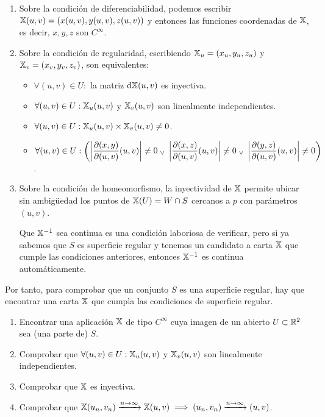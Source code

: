 
\begin{enumerate}
	\item Sobre la condición de diferenciabilidad, podemos escribir $\mathbb{X}(u, v) = (x(u, v), y(u, v), z(u, v))$ y entonces las funciones coordenadas de $\mathbb{X}$, es decir, $x, y, z$ son $C^\infty$.
	\item Sobre la condición de regularidad, escribiendo $\mathbb{X}_u = (x_u, y_u, z_u)$ y $\mathbb{X}_v = (x_v, y_v, z_v)$, son equivalentes:
	      \begin{itemize}
		      \item $\forall (u, v) \in U : $ la matriz $\odif{\X}(u, v)$ es inyectiva.
		      \item $\forall (u, v) \in U : \mathbb{X}_u(u, v)$ y $\mathbb{X}_v(u, v)$ son linealmente independientes.
		      \item $\forall (u, v) \in U : \mathbb{X}_u(u, v) \times \mathbb{X}_v(u, v) \neq 0$.
		      \item $\displaystyle \forall (u, v) \in U : \left( \left|\pdv{{(x, y)}}{{(u,v)}}(u,v)\right| \neq 0 \; _{\vee} \; \left|\pdv{{(x, z)}}{{(u,v)}}(u,v)\right| \neq 0 \; _{\vee} \; \left|\pdv{{(y, z)}}{{(u,v)}}(u,v)\right| \neq 0 \right)$.
	      \end{itemize}
	\item Sobre la condición de homeomorfismo, la inyectividad de $\mathbb{X}$ permite ubicar sin ambigüedad los puntos de $\mathbb{X}(U) = W\cap S$ cercanos a $p$ con parámetros $(u, v)$.

	      Que $\mathbb{X}^{-1}$ sea continua es una condición laboriosa de verificar, pero si ya sabemos que $S$ es superficie regular y tenemos un candidato a carta $\mathbb{X}$ que cumple las condiciones anteriores, entonces $\mathbb{X}^{-1}$ es continua automáticamente.
\end{enumerate}

Por tanto, para comprobar que un conjunto $S$ es una superficie regular, hay que encontrar una carta $\mathbb{X}$ que cumpla las condiciones de superficie regular.
\begin{enumerate}
	\item Encontrar una aplicación $\mathbb{X}$ de tipo $C^\infty$ cuya imagen de un abierto $U \subset \mathbb{R}^2$ sea (una parte de) $S$.
	\item Comprobar que $\forall (u, v) \in U : \mathbb{X}_u(u, v)$ y $\mathbb{X}_v(u, v)$ son linealmente independientes.
	\item Comprobar que $\mathbb{X}$ es inyectiva.
	\item Comprobar que $\mathbb{X}(u_n, v_n) \xrightarrow{n \to \infty} \mathbb{X}(u,v) \implies (u_n, v_n) \xrightarrow{n \to \infty} (u, v)$.
\end{enumerate}

